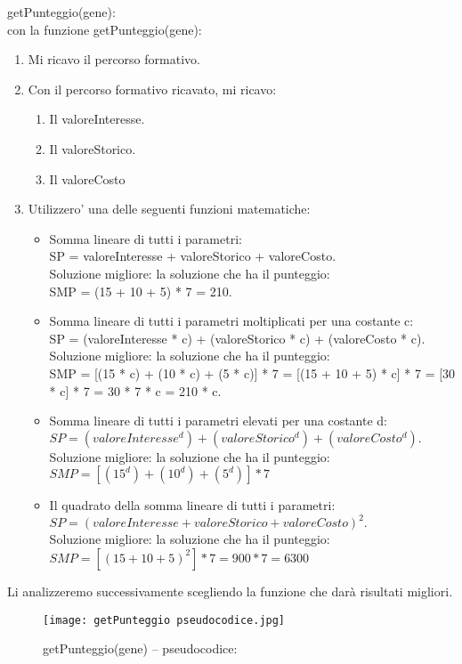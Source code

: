 \documentclass[10pt,a4paper]{article}
\begin{document}
      
      getPunteggio(gene):\\
      con la funzione getPunteggio(gene):\\
      \begin{enumerate}
       \item Mi ricavo il percorso formativo.
       \item Con il percorso formativo ricavato, mi ricavo:
         \begin{enumerate}
           \item Il valoreInteresse.
           \item Il valoreStorico.
           \item Il valoreCosto
         \end{enumerate}
       \item Utilizzero' una delle seguenti funzioni matematiche:
         \begin{itemize}
           \item Somma lineare di tutti i parametri:\\
                 SP = valoreInteresse + valoreStorico + valoreCosto.\\
                 Soluzione migliore: la soluzione che ha il punteggio:\\
                 SMP = (15 + 10 + 5) * 7 = 210.           
           \item Somma lineare di tutti i parametri moltiplicati per una costante c:\\
                 SP = (valoreInteresse * c) + (valoreStorico * c) + (valoreCosto * c).\\
                 Soluzione migliore: la soluzione che ha il punteggio:\\
                 SMP = [(15 * c) + (10 * c) + (5 * c)] * 7 = [(15 + 10 + 5) * c] * 7 = [30 * c] * 7 =
                 30 * 7 * c =  210 * c.
           \item Somma lineare di tutti i parametri elevati per una costante d:\\
                 $SP = (valoreInteresse ^ d) + (valoreStorico ^ d) + (valoreCosto ^ d).$\\
                 Soluzione migliore: la soluzione che ha il punteggio:\\
                 $SMP = [(15 ^ d) + (10 ^ d) + (5 ^ d)] * 7$
           \item Il quadrato della somma lineare di tutti i parametri:\\
                 $SP = (valoreInteresse + valoreStorico + valoreCosto)^ 2.$\\
                 Soluzione migliore: la soluzione che ha il punteggio:\\
                 $SMP = [(15 + 10 + 5) ^ 2] * 7 = 900 * 7 = 6300$
         \end{itemize}
       \end{enumerate}
       Li analizzeremo successivamente scegliendo la funzione che darà risultati migliori.
       \begin{figure}[h!]
        \centering
        \caption{getPunteggio(gene) -- pseudocodice:}
        \texttt{[image: getPunteggio pseudocodice.jpg]}
        \label{funzioneObiettivoPseudocodice}
      \end{figure}
      
\end{document}
